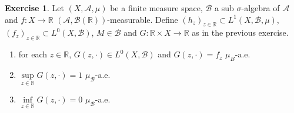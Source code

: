 \documentclass{book}
\theoremstyle{definition}
\newtheorem{ex}[definition]{Exercise}
\newcommand{\sig}{\sigma}
\newcommand{\R}{\mathbb{R}}
\newcommand{\MA}{\mathcal{A}}
\newcommand{\MB}{\mathcal{B}}
\DeclareMathOperator*{\0}{\mbf{0}}
\DeclareMathOperator*{\1}{\mbf{1}}
\begin{document}
	\begin{ex}
		Let $(X, \MA, \mu)$ be a finite measure space, $\MB$ a sub $\sig$-algebra of $\MA$ and $f: X \rightarrow \R$ $(\MA, \MB(\R))$-measurable. Define $(h_z)_{z \in \R} \subset L^1(X, \MB, \mu)$, $(f_z)_{z \in \R} \subset L^0(X, \MB)$, $M \in \MB$ and $G:\R \times X \rightarrow \R$ as in the previous exercise.
		\begin{enumerate}
			\item for each $z \in \R$, $G(z, \cdot) \in L^0(X, \MB)$ and $G(z, \cdot) = f_z$ $\mu_B$-a.e.
			\item $\sup\limits_{z \in \R} G(z, \cdot) = 1$ $\mu_{\MB}$-a.e.
			\item $\inf\limits_{z \in \R} G(z, \cdot) = 0$ $\mu_{\MB}$-a.e.
		\end{enumerate}
	\end{ex}
	
\end{document}

